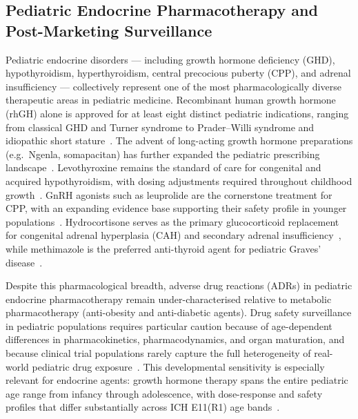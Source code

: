 \documentclass[10pt,twocolumn]{article}
\begin{document}
\subsection{Pediatric Endocrine Pharmacotherapy and Post-Marketing Surveillance}
 
Pediatric endocrine disorders --- including growth hormone deficiency (GHD), hypothyroidism, hyperthyroidism, central precocious puberty (CPP), and adrenal insufficiency --- collectively represent one of the most pharmacologically diverse therapeutic areas in pediatric medicine. Recombinant human growth hormone (rhGH) alone is approved for at least eight distinct pediatric indications, ranging from classical GHD and Turner syndrome to Prader--Willi syndrome and idiopathic short stature~\cite{grimberg2016}. The advent of long-acting growth hormone preparations (e.g.\ Ngenla, somapacitan) has further expanded the pediatric prescribing landscape~\cite{saenger2023}. Levothyroxine remains the standard of care for congenital and acquired hypothyroidism, with dosing adjustments required throughout childhood growth~\cite{biondi2019}. GnRH agonists such as leuprolide are the cornerstone treatment for CPP, with an expanding evidence base supporting their safety profile in younger populations~\cite{carel2009}. Hydrocortisone serves as the primary glucocorticoid replacement for congenital adrenal hyperplasia (CAH) and secondary adrenal insufficiency~\cite{bornstein2016}, while methimazole is the preferred anti-thyroid agent for pediatric Graves' disease~\cite{rivkees2014}.
 
Despite this pharmacological breadth, adverse drug reactions (ADRs) in pediatric endocrine pharmacotherapy remain under-characterised relative to metabolic pharmacotherapy (anti-obesity and anti-diabetic agents). Drug safety surveillance in pediatric populations requires particular caution because of age-dependent differences in pharmacokinetics, pharmacodynamics, and organ maturation, and because clinical trial populations rarely capture the full heterogeneity of real-world pediatric drug exposure~\cite{kearns2003}. This developmental sensitivity is especially relevant for endocrine agents: growth hormone therapy spans the entire pediatric age range from infancy through adolescence, with dose-response and safety profiles that differ substantially across ICH E11(R1) age bands~\cite{ich2017}.
 
\end{document}
